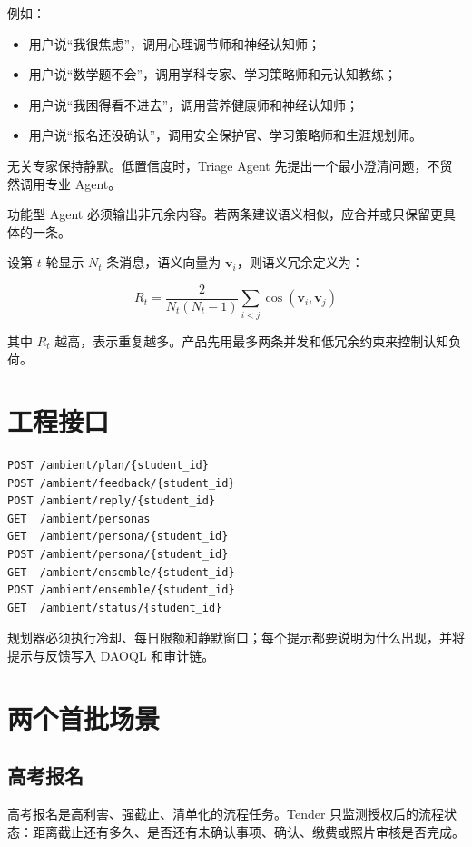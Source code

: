 \documentclass[UTF8,a4paper,11pt]{ctexart}
\begin{document}
例如：

\begin{itemize}[leftmargin=2em]
\item 用户说“我很焦虑”，调用心理调节师和神经认知师；
\item 用户说“数学题不会”，调用学科专家、学习策略师和元认知教练；
\item 用户说“我困得看不进去”，调用营养健康师和神经认知师；
\item 用户说“报名还没确认”，调用安全保护官、学习策略师和生涯规划师。
\end{itemize}

无关专家保持静默。低置信度时，Triage Agent 先提出一个最小澄清问题，不贸然调用专业 Agent。

功能型 Agent 必须输出非冗余内容。若两条建议语义相似，应合并或只保留更具体的一条。

设第 \(t\) 轮显示 \(N_t\) 条消息，语义向量为 \(\mathbf v_i\)，则语义冗余定义为：

\[
R_t=\frac{2}{N_t(N_t-1)}\sum_{i<j}\cos(\mathbf v_i,\mathbf v_j)
\]

其中 \(R_t\) 越高，表示重复越多。产品先用最多两条并发和低冗余约束来控制认知负荷。

\section{工程接口}

\begin{verbatim}
POST /ambient/plan/{student_id}
POST /ambient/feedback/{student_id}
POST /ambient/reply/{student_id}
GET  /ambient/personas
GET  /ambient/persona/{student_id}
POST /ambient/persona/{student_id}
GET  /ambient/ensemble/{student_id}
POST /ambient/ensemble/{student_id}
GET  /ambient/status/{student_id}
\end{verbatim}

规划器必须执行冷却、每日限额和静默窗口；每个提示都要说明为什么出现，并将提示与反馈写入 DAOQL 和审计链。

\section{两个首批场景}

\subsection{高考报名}

高考报名是高利害、强截止、清单化的流程任务。Tender 只监测授权后的流程状态：距离截止还有多久、是否还有未确认事项、确认、缴费或照片审核是否完成。
\end{document}
